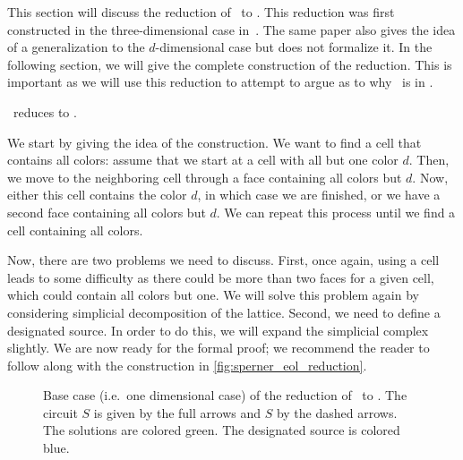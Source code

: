 This section will discuss the reduction of \Sperner\ to \EndOfLine. This reduction was first constructed in the three-dimensional case in~. The same paper also gives the idea of a generalization to the $d$-dimensional case but does not formalize it. In the following section, we will give the complete construction of the reduction. This is important as we will use this reduction to attempt to argue as to why \Tarskistar\ is in \EOPL\@.

\begin{theorem}
	\Sperner\ reduces to \EndOfLine.
\end{theorem}

We start by giving the idea of the construction. We want to find a cell that contains all colors: assume that we start at a cell with all but one color $d$. Then, we move to the neighboring cell through a face containing all colors but $d$. Now, either this cell contains the color $d$, in which case we are finished, or we have a second face containing all colors but $d$. We can repeat this process until we find a cell containing all colors.

Now, there are two problems we need to discuss. First, once again, using a cell leads to some difficulty as there could be more than two faces for a given cell, which could contain all colors but one. We will solve this problem again by considering simplicial decomposition of the lattice. Second, we need to define a designated source. In order to do this, we will expand the simplicial complex slightly. We are now ready for the formal proof; we recommend the reader to follow along with the construction in \cref{fig:sperner_eol_reduction}.

\begin{figure}
	\centering
	\caption[Base case of the reduction of \Sperner\ to \EndOfLine]{Base case (i.e.~one dimensional case) of the reduction of \Sperner\ to \EndOfLine. The circuit $S$ is given by the full arrows and $S$ by the dashed arrows. The solutions are colored green. The designated source is colored blue.}\label{fig:sperner_eol_base_case}
\end{figure}


